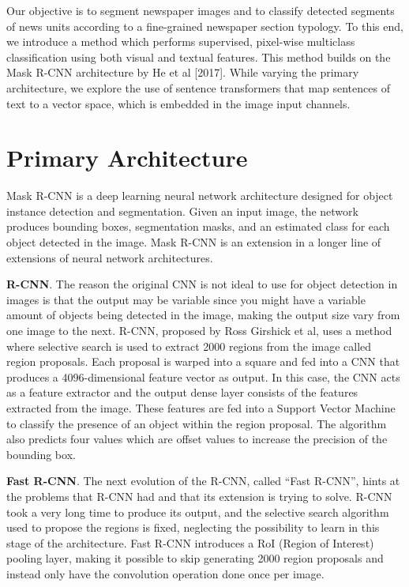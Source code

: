 \documentclass[english, bibtex]{kththesis}
\begin{document}
Our objective is to segment newspaper images and to classify detected segments of news units according to a fine-grained newspaper section typology. To this end, we introduce a method which performs supervised, pixel-wise multiclass classification using both visual and textual features. This method builds on the Mask R-CNN architecture by He et al [2017]. While varying the primary architecture, we explore the use of sentence transformers that map sentences of text to a vector space, which is embedded in the image input channels.

\section{Primary Architecture}

Mask R-CNN is a deep learning neural network architecture designed for object instance detection and segmentation. Given an input image, the network produces bounding boxes, segmentation masks, and an estimated class for each object detected in the image. Mask R-CNN is an extension in a longer line of extensions of neural network architectures.

\textbf{R-CNN}. The reason the original CNN is not ideal to use for object detection in images is that the output may be variable since you might have a variable amount of objects being detected in the image, making the output size vary from one image to the next. R-CNN, proposed by Ross Girshick et al, uses a method where selective search is used to extract 2000 regions from the image called region proposals. Each proposal is warped into a square and fed into a CNN that produces a 4096-dimensional feature vector as output. In this case, the CNN acts as a feature extractor and the output dense layer consists of the features extracted from the image. These features are fed into a Support Vector Machine to classify the presence of an object within the region proposal. The algorithm also predicts four values which are offset values to increase the precision of the bounding box.  

\textbf{Fast R-CNN}. The next evolution of the R-CNN, called “Fast R-CNN”, hints at the problems that R-CNN had and that its extension is trying to solve. R-CNN took a very long time to produce its output, and the selective search algorithm used to propose the regions is fixed, neglecting the possibility to learn in this stage of the architecture. Fast R-CNN introduces a RoI (Region of Interest) pooling layer, making it possible to skip generating 2000 region proposals and instead only have the convolution operation done once per image. 
\end{document}
